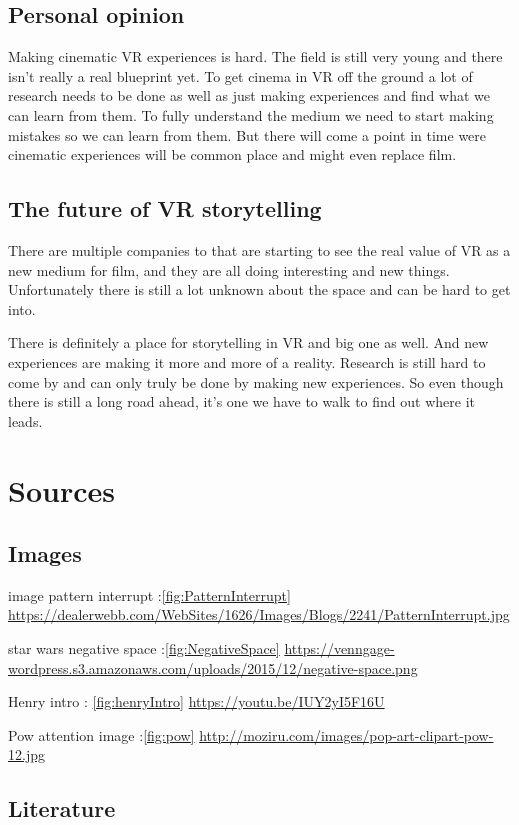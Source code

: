 \documentclass{report}
\begin{document}
				
				
				\section{Personal opinion}
				
				Making cinematic VR experiences is hard. The field is still very young and there isn't really a real blueprint yet. To get cinema in VR off the ground a lot of research needs to be done as well as just making experiences and find what we can learn from them. To fully understand the medium we need to start making mistakes so we can learn from them.
				But there will come a point in time were cinematic experiences will be common place and might even replace film.

				
				\section{The future of VR storytelling}
				
				There are multiple companies to that are starting to see the real value of VR as a new medium for film, and they are all doing interesting and new things. Unfortunately there is still a lot unknown about the space and can be hard to get into.
				 				
				There is definitely a place for storytelling in VR and big one as well. And new experiences are making it more and more of a reality. Research is still hard to come by and can only truly be done by making new experiences. So even though there is still a long road ahead, it's one we have to walk to find out where it leads.
				
				\chapter{Sources}
				
				\section{Images}
				
				
				image pattern interrupt :\ref{fig:PatternInterrupt} \href{https://dealerwebb.com/WebSites/1626/Images/Blogs/2241/PatternInterrupt.jpg}{https://dealerwebb.com/WebSites/1626/Images/Blogs/2241/PatternInterrupt.jpg}
				
				star wars negative space :\ref{fig:NegativeSpace} \href{https://venngage-wordpress.s3.amazonaws.com/uploads/2015/12/negative-space.png}{https://venngage-wordpress.s3.amazonaws.com/uploads/2015/12/negative-space.png}
				
				Henry intro : \ref{fig:henryIntro} \href{https://youtu.be/IUY2yI5F16U}{https://youtu.be/IUY2yI5F16U}
				
				Pow attention image :\ref{fig:pow}
				\href{http://moziru.com/images/pop-art-clipart-pow-12.jpg}{http://moziru.com/images/pop-art-clipart-pow-12.jpg}
				
				\section{Literature}
				
				
				
		
\end{document}
